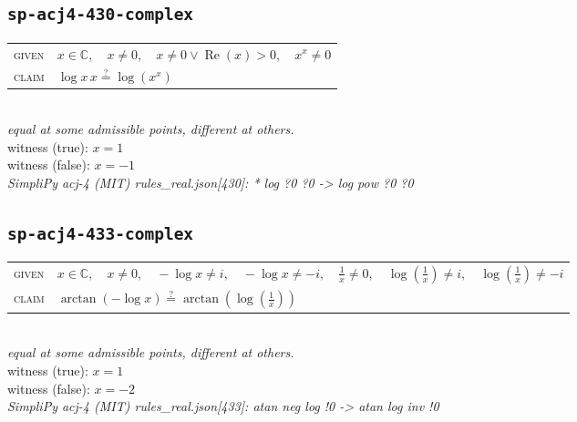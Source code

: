 \documentclass[11pt]{article}
\begin{document}
\subsection*{\texttt{sp-acj4-430-complex}}
\begin{tabular}{@{}l@{\quad}l@{}}
\textsc{given} & $x \in \mathbb{C},\quad x \neq 0,\quad x \neq 0 \lor \operatorname{Re}\left(x\right) > 0,\quad x^{x} \neq 0$ \\[4pt]
\textsc{claim} & $\displaystyle \log x \, x \overset{?}{=} \log\left(x^{x}\right)$ \\
\end{tabular}\\[2pt]
{\small\emph{equal at some admissible points, different at others.}}\\
{\footnotesize\color{gray}witness (true): $x = 1$}\\
{\footnotesize\color{gray}witness (false): $x = -1$}\\
\emph{SimpliPy acj-4 (MIT) rules\_real.json[430]: * log ?0 ?0  ->  log pow ?0 ?0}\\

\subsection*{\texttt{sp-acj4-433-complex}}
\begin{tabular}{@{}l@{\quad}l@{}}
\textsc{given} & $x \in \mathbb{C},\quad x \neq 0,\quad -\log x \neq i,\quad -\log x \neq -i,\quad \frac{1}{x} \neq 0,\quad \log\left(\frac{1}{x}\right) \neq i,\quad \log\left(\frac{1}{x}\right) \neq -i$ \\[4pt]
\textsc{claim} & $\displaystyle \arctan\left(-\log x\right) \overset{?}{=} \arctan\left(\log\left(\frac{1}{x}\right)\right)$ \\
\end{tabular}\\[2pt]
{\small\emph{equal at some admissible points, different at others.}}\\
{\footnotesize\color{gray}witness (true): $x = 1$}\\
{\footnotesize\color{gray}witness (false): $x = -2$}\\
\emph{SimpliPy acj-4 (MIT) rules\_real.json[433]: atan neg log !0  ->  atan log inv !0}\\
\end{document}
